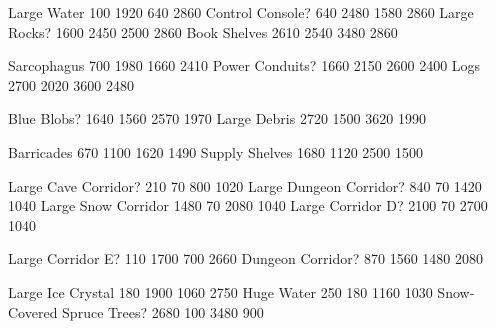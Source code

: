  {Large Water} {100 1920 640 2860}
  {Control Console?} {640 2480 1580 2860}
  {Large Rocks?} {1600 2450 2500 2860}
  {Book Shelves} {2610 2540 3480 2860}

  {Sarcophagus} {700 1980 1660 2410}
  {Power Conduits?} { 1660 2150 2600 2400}
  {Logs} { 2700 2020 3600 2480}

  {Blue Blobs?} {1640 1560 2570 1970}
  {Large Debris} {2720 1500 3620 1990}

  {Barricades} {670 1100 1620 1490}
  {Supply Shelves} {1680 1120 2500 1500}

  {Large Cave Corridor?} {210 70 800 1020}
  {Large Dungeon Corridor?} {840 70 1420 1040}
  {Large Snow Corridor} {1480 70 2080 1040}
  {Large Corridor D?} {2100 70 2700 1040}

\def\tilejpg{annotated-002.jpg}

  {Large Corridor E?} { 110 1700 700 2660}
  {Dungeon Corridor?} { 870 1560 1480 2080}

\def\tilejpg{terrain-004.jpg}

 {Large Ice Crystal} { 180 1900 1060 2750}
 {Huge Water} {250 180 1160 1030}
 {Snow-Covered Spruce Trees?} { 2680 100 3480 900}
